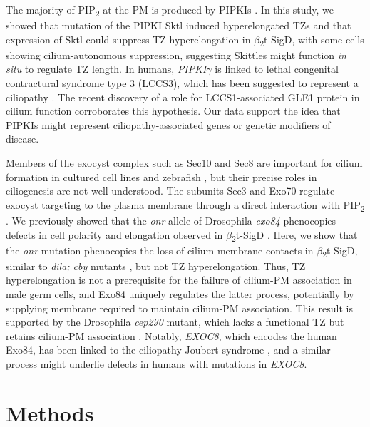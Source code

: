 \documentclass[12pt, twoside, letterpaper]{article}
\newcommand{\PIP}{PIP\textsubscript{2}}
\newcommand{\sigd}{$\beta$\textsubscript{2}t-SigD}
\begin{document}
\begin{doublespacing}
\begin{linenumbers}
    The majority of \PIP{} at the PM is produced by PIPKIs
    \citep{balla2013phosphoinositides, hammond2012pi4p}.
    In this study, we showed that mutation of the PIPKI Sktl
    induced hyperelongated TZs
    and that expression of Sktl could suppress TZ hyperelongation in \sigd{},
    with some cells showing cilium-autonomous suppression,
    suggesting Skittles might function \textit{in situ} to regulate TZ length.
    In humans, \textit{PIPKI$\gamma$} is linked to lethal congenital contractural
    syndrome type 3 (LCCS3), which has been suggested to represent a ciliopathy
    \citep{xu2016phosphatidylinositol}.
    The recent discovery of a role for LCCS1-associated GLE1 protein in cilium
    function \citep{jao2017role} corroborates this hypothesis.
    Our data support the idea that PIPKIs might represent ciliopathy-associated genes
    or genetic modifiers of disease.

    Members of the exocyst complex such as Sec10 and Sec8 are
    important for cilium formation in cultured cell lines and zebrafish
    \citep{zuo2009exocyst, lobo2017exocyst, seixas2016arl13b},
    but their precise roles in ciliogenesis are not well understood.
    The subunits Sec3 and Exo70 regulate exocyst targeting to the plasma
    membrane through a direct interaction with \PIP{}
    \citep{he2007exo70, zhang2008membrane}.
    We previously showed that
    the \textit{onr} allele of Drosophila \textit{exo84} phenocopies
    defects in cell polarity and elongation observed in \sigd{}
    \citep{fabian2010phosphatidylinositol}.
    Here, we show that the \textit{onr} mutation
    phenocopies the loss of cilium-membrane contacts in \sigd{}, similar to
    \textit{dila; cby} mutants \citep{vieillard2016transition},
    but not TZ hyperelongation.
    Thus, TZ hyperelongation is not a prerequisite for the failure of
    cilium-PM association in male germ cells,
    and Exo84 uniquely regulates the latter process,
    potentially by supplying membrane required to maintain cilium-PM
    association.
    This result is supported by the Drosophila \textit{cep290} mutant,
    which lacks a functional TZ but retains cilium-PM
    association \cite{basiri2014migrating}.
    Notably, \textit{EXOC8}, which encodes the human Exo84, has
    been linked to the ciliopathy Joubert syndrome
    \citep{dixon2012exome},
    and a similar process might underlie defects in humans with
    mutations in \textit{EXOC8}.

    \section*{Methods}

\end{linenumbers}
\end{doublespacing}
\end{document}
